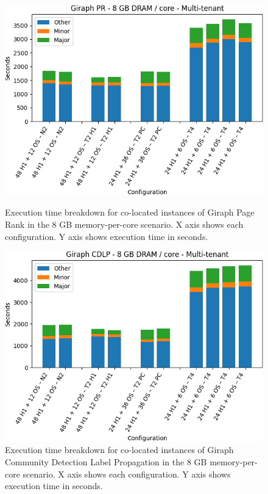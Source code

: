 \begin{figure}[thbp]
        \centering
    \includegraphics[width=\linewidth]{./fig/g_pr128.png}
    \caption{Execution time breakdown for co-located instances of Giraph
    Page Rank in the 8 GB memory-per-core scenario. X axis shows each configuration.
	Y axis shows execution time in seconds.}
    \label{fig:g_pr128}
    \includegraphics[width=\linewidth]{./fig/g_cdlp128.png}
    \caption{Execution time breakdown for co-located instances of Giraph
    Community Detection Label Propagation in the 8 GB memory-per-core scenario. X axis shows each configuration. Y axis shows execution
	time in seconds.}
    \label{fig:g_cdlp128}
\end{figure}

